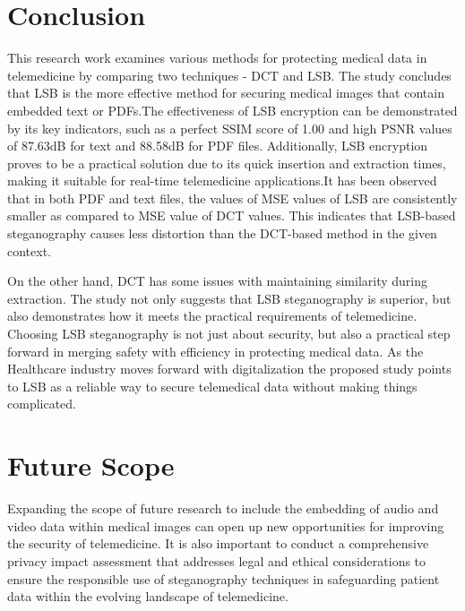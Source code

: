 \documentclass{ieeeaccess}
\begin{document}
\section{Conclusion}\label{sec6}
 This research work examines various methods for protecting medical data in telemedicine by comparing two techniques - DCT and LSB. The study concludes that LSB is the more effective method for securing medical images that contain embedded text or PDFs.The effectiveness of LSB encryption can be demonstrated by its key indicators, such as a perfect SSIM score of 1.00 and high PSNR values of 87.63dB for text and 88.58dB for PDF files. Additionally, LSB encryption proves to be a practical solution due to its quick insertion and extraction times, making it suitable for real-time telemedicine applications.It has been observed that in both PDF and text files, the values of MSE values of LSB are consistently smaller as compared to MSE value of DCT values. This indicates that LSB-based steganography causes less distortion than the DCT-based method in the given context.



On the other hand, DCT has some issues with maintaining similarity during extraction. The study not only suggests that LSB steganography is superior, but also demonstrates how it meets the practical requirements of telemedicine. Choosing LSB steganography is not just about security, but also a practical step forward in merging safety with efficiency in protecting medical data. As the Healthcare industry moves forward with digitalization the proposed study points to LSB as a reliable way to secure telemedical data without making things complicated.
\section{Future Scope}

Expanding the scope of future research to include the embedding of audio and video data within medical images can open up new opportunities for improving the security of telemedicine. It is also important to conduct a comprehensive privacy impact assessment that addresses legal and ethical considerations to ensure the responsible use of steganography techniques in safeguarding patient data within the evolving landscape of telemedicine.


%


\end{document}
